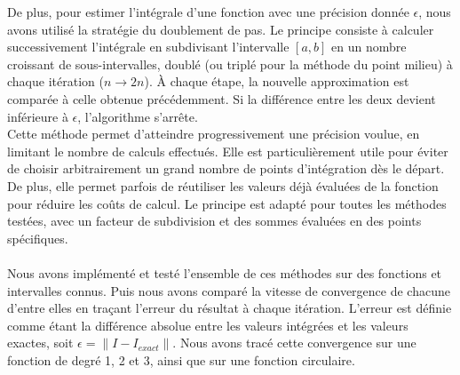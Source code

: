 \documentclass{article}
\begin{document}
De plus, pour estimer l'intégrale d'une fonction avec une précision donnée $\epsilon$, nous avons utilisé la stratégie du doublement de pas. Le principe consiste à calculer successivement l'intégrale en subdivisant l'intervalle $[a,b]$ en un nombre croissant de sous-intervalles, doublé (ou triplé pour la méthode du point milieu) à chaque itération ($n \rightarrow 2n$). À chaque étape, la nouvelle approximation est comparée à celle obtenue précédemment. Si la différence entre les deux devient inférieure à $\epsilon$, l'algorithme s'arrête.\\
Cette méthode permet d’atteindre progressivement une précision voulue, en limitant le nombre de calculs effectués. Elle est particulièrement utile pour éviter de choisir arbitrairement un grand nombre de points d'intégration dès le départ. De plus, elle permet parfois de réutiliser les valeurs déjà évaluées de la fonction pour réduire les coûts de calcul. Le principe est adapté pour toutes les méthodes testées, avec un facteur de subdivision et des sommes évaluées en des points spécifiques. \\ \\
Nous avons implémenté et testé l'ensemble de ces méthodes sur des fonctions et intervalles connus. Puis nous avons comparé la vitesse de convergence de chacune d'entre elles en traçant l'erreur du résultat à chaque itération. L'erreur est définie comme étant la différence absolue entre les valeurs intégrées et les valeurs exactes, soit $\epsilon = \|I - I_{exact}\|$. Nous avons tracé cette convergence sur une fonction de degré 1, 2 et 3, ainsi que sur une fonction circulaire. 
\end{document}
